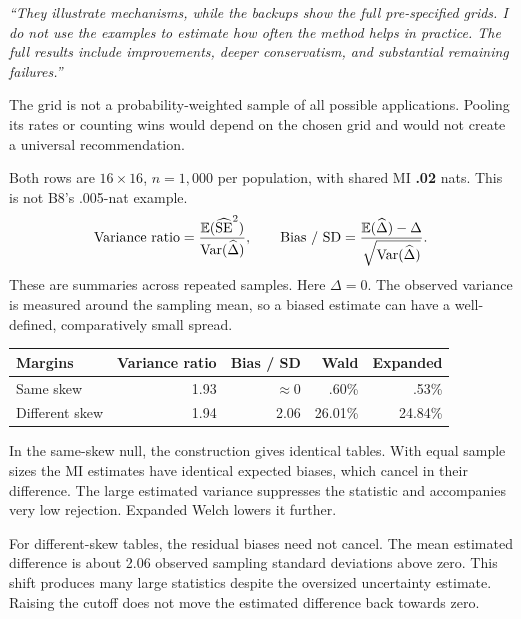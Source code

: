 \emph{``They illustrate mechanisms, while the backups show the full pre-specified grids. I do not use the examples to estimate how often the method helps in practice. The full results include improvements, deeper conservatism, and substantial remaining failures.''}

The grid is not a probability-weighted sample of all possible applications. Pooling its rates or counting wins would depend on the chosen grid and would not create a universal recommendation.

\newpage
{}

Both rows are \(16\times16\), \(n=1{,}000\) per population, with shared MI \textbf{.02} nats. This is not B8's .005-nat example.
\[
\text{Variance ratio}=\frac{\mathbb E(\widehat{\mathrm{SE}}^2)}{\operatorname{Var}(\widehat\Delta)},\qquad
\text{Bias / SD}=\frac{\mathbb E(\widehat\Delta)-\Delta}{\sqrt{\operatorname{Var}(\widehat\Delta)}}.
\]
These are summaries across repeated samples. Here \(\Delta=0\). The observed variance is measured around the sampling mean, so a biased estimate can have a well-defined, comparatively small spread.

\begin{center}
\begin{tabular}{@{}lrrrr@{}}
\toprule
\textbf{Margins} & \textbf{Variance ratio} & \textbf{Bias / SD} & \textbf{Wald} & \textbf{Expanded}\\
\midrule
Same skew & 1.93 & \(\approx0\) & .60\% & .53\%\\
Different skew & 1.94 & 2.06 & 26.01\% & 24.84\%\\
\bottomrule
\end{tabular}
\end{center}

In the same-skew null, the construction gives identical tables. With equal sample sizes the MI estimates have identical expected biases, which cancel in their difference. The large estimated variance suppresses the statistic and accompanies very low rejection. Expanded Welch lowers it further.

For different-skew tables, the residual biases need not cancel. The mean estimated difference is about 2.06 observed sampling standard deviations above zero. This shift produces many large statistics despite the oversized uncertainty estimate. Raising the cutoff does not move the estimated difference back towards zero.

